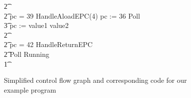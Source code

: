 \begin{figure}
\begin{center}
\begin{multicols}{4}
\begin{circus}
        \t2 {} \cdots {} \\
        \t2 {} \circelse pc = 39 \circthen HandleAloadEPC(4) \circseq pc := 36 \circseq Poll \circseq \cdots \circseq \\
        \t3 pc := \IF value1 \leq value2   \\
        \t2 {} \cdots {} \\
        \t2 {} \circelse pc = 42 \circthen HandleReturnEPC \\
        \t2 \circfi \circseq Poll \circseq Running \\
        \t1 \circfi
      \end{circus}
    \end{multicols}
  \end{center}
  \caption{Simplified control flow graph and corresponding code for our example
    program}
  \label{example-simplified-control-flow-graph-figure}
\end{figure}

  

